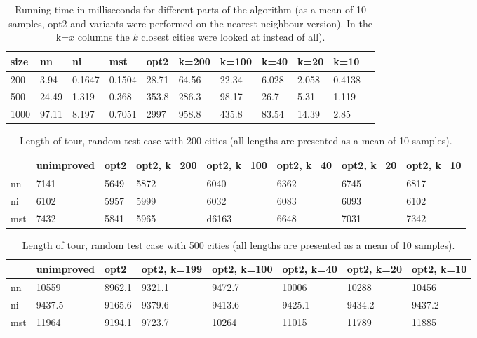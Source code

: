 \documentclass{report}
\begin{document}
\begin{table}
  \centering
  \begin{tabular}{|l|l|l|l|l|l|l|l|l|l|l|} \hline
size & nn    & ni     & mst    & opt2 & k=200 & k=100 & k=40 & k=20 & k=10 \\ \hline
200  &       3.94     & 0.1647 & 0.1504 & 28.71 & 64.56 & 22.34 & 6.028 & 2.058 & 0.4138\\ \hline 
500  &       24.49    & 1.319  & 0.368 & 353.8 & 286.3 & 98.17 & 26.7 & 5.31 & 1.119\\ \hline 
1000 &       97.11    & 8.197  & 0.7051 & 2997 & 958.8 & 435.8 & 83.54 & 14.39 & 2.85\\ \hline
  \end{tabular}
  \caption{Running time in milliseconds for different parts of the algorithm (as a mean of 10 samples, opt2 and variants were performed on the nearest neighbour version). In the k=$x$ columns the $k$ closest cities were looked at instead of all).}
  \label{runningtimes}
\end{table}

\begin{table}
  \centering
  \begin{tabular}{|l|l|l|l|l|l|l|l|}
    \hline
   &    unimproved      & opt2         & opt2, k=200  & opt2, k=100  & opt2, k=40   & opt2, k=20   & opt2, k=10  \\ \hline
nn & 7141 & 5649 & 5872 & 6040 & 6362 & 6745 & 6817 \\ \hline
ni & 6102 & 5957 & 5999 & 6032 & 6083 & 6093 & 6102 \\ \hline
mst & 7432 & 5841 & 5965 & d6163 & 6648 & 7031 & 7342 \\ \hline
  \end{tabular}
  \caption{Length of tour, random test case with 200 cities (all lengths are presented as a mean of 10 samples).}
  \label{t200}
\end{table}


\begin{table}
  \centering
  \begin{tabular}{|l|l|l|l|l|l|l|l|}
    \hline
   &    unimproved      & opt2         & opt2, k=199  & opt2, k=100  & opt2, k=40   & opt2, k=20   & opt2, k=10  \\ \hline
nn & 10559 & 8962.1 & 9321.1 & 9472.7 & 10006 & 10288 & 10456 \\ \hline
ni & 9437.5 & 9165.6 & 9379.6 & 9413.6 & 9425.1 & 9434.2 & 9437.2 \\ \hline
mst & 11964 & 9194.1 & 9723.7 & 10264 & 11015 & 11789 & 11885 \\ \hline
  \end{tabular}
  \caption{Length of tour, random test case with 500 cities (all lengths are presented as a mean of 10 samples).}
  \label{t500}
\end{table}
\end{document}
